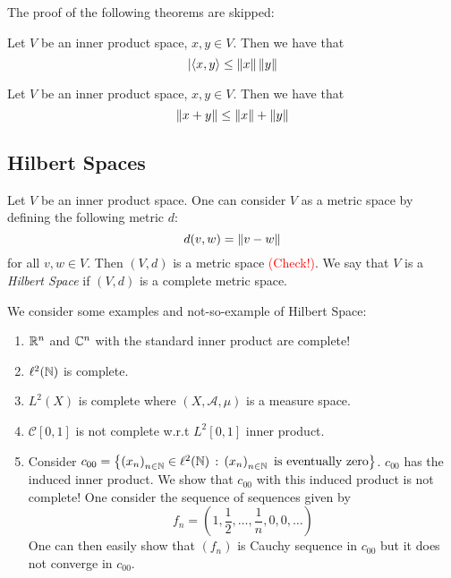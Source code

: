 The proof of the following theorems are skipped:
\begin{theorem}
    Let $V$ be an inner product space, $x,y \in V$. Then we have that 
    \begin{equation*}
	\lvert \left\langle x,y \right\rangle \le \left\lVert x \right\rVert\left\lVert y \right\rVert
    \end{equation*}
    \label{thm:CS-inequality}
\end{theorem}

\begin{theorem}
    Let $V$ be an inner product space, $x,y \in V$. Then we have that 
    \begin{equation*}
	\left\lVert x+y \right\rVert \le \left\lVert x \right\rVert + \left\lVert y \right\rVert
    \end{equation*}
    \label{thm:triangle-inequality}
\end{theorem}

\subsection{Hilbert Spaces}
\begin{definition}
    Let $V$ be an inner product space. One can consider $V$ as a metric space by defining the following metric $d$:
    \begin{equation*}
	d(v,w) = \left\lVert v-w \right\rVert
    \end{equation*}
    for all $v,w \in V$. Then $(V,d)$ is a metric space \textcolor{red}{(Check!)}. We say that $V$ is a \textit{Hilbert Space} if $(V,d)$ is a complete metric space.
    \label{def:Hilbert-Space}
\end{definition}

\begin{example} We consider some examples and not-so-example of Hilbert Space:
\begin{enumerate}
    \item $\mathbb R ^{n}$ and $\mathbb C ^{n}$ with the standard inner product are complete!
    \item $\ell ^{2} (\mathbb N )$ is complete.
    \item $L^2(X)$ is complete where $(X, \mathscr A , \mu)$ is a measure space.
    \item $\mathcal {C} [0,1]$ is not complete w.r.t $L^2[0,1]$ inner product. 
    \item Consider $c_{00} = \left\{ \left( x_{n} \right)_{n\in \mathbb N} \in \ell ^{2} (\mathbb N) \, : \, \left( x_{n} \right) _{n \in \mathbb N} \text{ is eventually zero} \right\}$. $c_{00}$ has the induced inner product. We show that $c_{00}$ with this induced product is not complete!
	One consider the sequence of sequences given by
	\begin{equation*}
	    f_{n} = \left( 1, \frac{1}{2} , \ldots , \frac{1}{n} , 0,0, \ldots \right)
	\end{equation*}
	One can then easily show that $\left( f_n \right)$ is Cauchy sequence in $c_{00}$ but it does not converge in $c_{00}$.
\end{enumerate}
\end{example}
